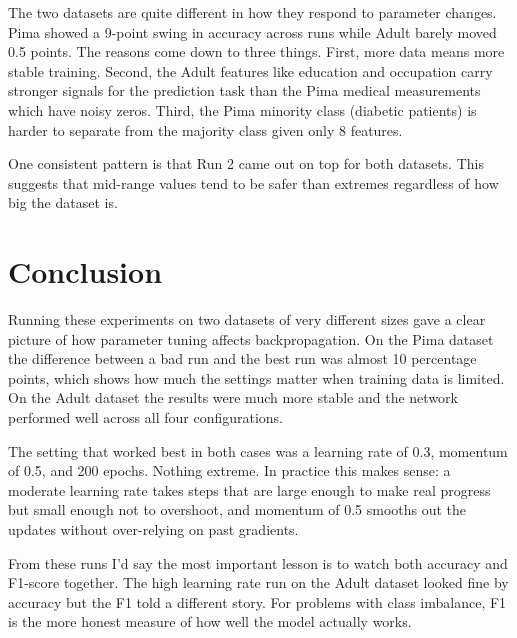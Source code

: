 \documentclass[12pt,a4paper]{article}
\begin{document}
The two datasets are quite different in how they respond to parameter changes.
Pima showed a 9-point swing in accuracy across runs while Adult barely moved 0.5
points. The reasons come down to three things. First, more data means more stable
training. Second, the Adult features like education and occupation carry stronger
signals for the prediction task than the Pima medical measurements which have
noisy zeros. Third, the Pima minority class (diabetic patients) is harder to
separate from the majority class given only 8 features.

One consistent pattern is that Run 2 came out on top for both datasets.
This suggests that mid-range values tend to be safer than extremes regardless
of how big the dataset is.

\section{Conclusion}

Running these experiments on two datasets of very different sizes gave a clear
picture of how parameter tuning affects backpropagation. On the Pima dataset the
difference between a bad run and the best run was almost 10 percentage points,
which shows how much the settings matter when training data is limited. On the
Adult dataset the results were much more stable and the network performed well
across all four configurations.

The setting that worked best in both cases was a learning rate of 0.3, momentum
of 0.5, and 200 epochs. Nothing extreme. In practice this makes sense: a
moderate learning rate takes steps that are large enough to make real progress
but small enough not to overshoot, and momentum of 0.5 smooths out the updates
without over-relying on past gradients.

From these runs I'd say the most important lesson is to watch both accuracy and
F1-score together. The high learning rate run on the Adult dataset looked fine
by accuracy but the F1 told a different story. For problems with class imbalance,
F1 is the more honest measure of how well the model actually works.
\end{document}
